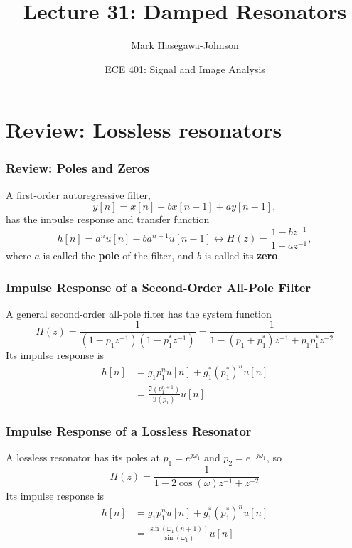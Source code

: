 \documentclass{beamer}
\title{Lecture 31: Damped Resonators}
\author{Mark Hasegawa-Johnson}
\date{ECE 401: Signal and Image Analysis}
\begin{document}
\begin{frame}
  \maketitle
\end{frame}

\begin{frame}
  \tableofcontents
\end{frame}

\section[Review]{Review: Lossless resonators}
\setcounter{subsection}{1}

\begin{frame}
  \frametitle{Review: Poles and Zeros}
  A first-order autoregressive filter,
  \[
  y[n] = x[n]-bx[n-1]+ay[n-1],
  \]
  has the impulse response and transfer function
  \[
  h[n]=a^n u[n]-ba^{n-1}u[n-1] \leftrightarrow H(z)  = \frac{1-bz^{-1}}{1-az^{-1}},
  \]
  where $a$ is called the {\bf pole} of the filter, and $b$ is called
  its {\bf zero}.
\end{frame}

\begin{frame}
  \frametitle{Impulse Response of a Second-Order All-Pole Filter}

  A general second-order all-pole filter has the system function
  \[
  H(z) = \frac{1}{(1-p_1z^{-1})(1-p_1^*z^{-1})}= \frac{1}{1-(p_1+p_1^*)z^{-1}+p_1p_1^*z^{-2}}
  \]
  Its impulse response is 
  \begin{align*}
    h[n] &= g_1p_1^n u[n] + g_1^* (p_1^*)^n u[n]\\
    &= \frac{\Im(p_1^{n+1})}{\Im(p_1)} u[n]
  \end{align*}
\end{frame}

\begin{frame}
  \frametitle{Impulse Response of a Lossless Resonator}

  A lossless resonator has its poles at $p_1=e^{j\omega_1}$ and
  $p_2=e^{-j\omega_1}$, so
  \[
  H(z) = \frac{1}{1-2\cos(\omega)z^{-1}+z^{-2}}
  \]
  Its impulse response is 
  \begin{align*}
    h[n] &= g_1p_1^n u[n] + g_1^* (p_1^*)^n u[n]\\
    &= \frac{\sin(\omega_1(n+1))}{\sin(\omega_1)} u[n]
  \end{align*}
\end{frame}
\end{document}
